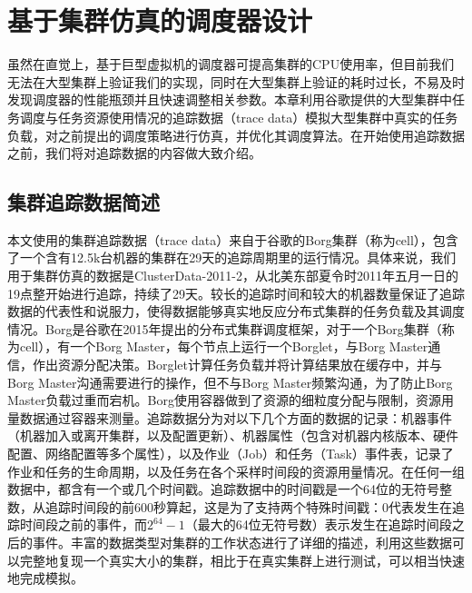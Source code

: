 
\chapter{基于集群仿真的调度器设计}
虽然在直觉上，基于巨型虚拟机的调度器可提高集群的CPU使用率，但目前我们无法在大型集群上验证我们的实现，同时在大型集群上验证的耗时过长，不易及时发现调度器的性能瓶颈并且快速调整相关参数。本章利用谷歌提供的大型集群中任务调度与任务资源使用情况的追踪数据（trace data）模拟大型集群中真实的任务负载，对之前提出的调度策略进行仿真，并优化其调度算法。在开始使用追踪数据之前，我们将对追踪数据的内容做大致介绍。

\section{集群追踪数据简述}
本文使用的集群追踪数据（trace data）来自于谷歌的Borg集群（称为cell），包含了一个含有12.5k台机器的集群在29天的追踪周期里的运行情况。具体来说，我们用于集群仿真的数据是ClusterData-2011-2，从北美东部夏令时2011年五月一日的19点整开始进行追踪，持续了29天。较长的追踪时间和较大的机器数量保证了追踪数据的代表性和说服力，使得数据能够真实地反应分布式集群的任务负载及其调度情况。Borg\cite{borg}是谷歌在2015年提出的分布式集群调度框架，对于一个Borg集群（称为cell），有一个Borg Master，每个节点上运行一个Borglet，与Borg Master通信，作出资源分配决策。Borglet计算任务负载并将计算结果放在缓存中，并与Borg Master沟通需要进行的操作，但不与Borg Master频繁沟通，为了防止Borg Master负载过重而宕机。Borg使用容器做到了资源的细粒度分配与限制，资源用量数据通过容器来测量。追踪数据分为对以下几个方面的数据的记录：机器事件（机器加入或离开集群，以及配置更新）、机器属性（包含对机器内核版本、硬件配置、网络配置等多个属性），以及作业（Job）和任务（Task）事件表，记录了作业和任务的生命周期，以及任务在各个采样时间段的资源用量情况。在任何一组数据中，都含有一个或几个时间戳。追踪数据中的时间戳是一个64位的无符号整数，从追踪时间段的前600秒算起，这是为了支持两个特殊时间戳：0代表发生在追踪时间段之前的事件，而$2^{64}-1$（最大的64位无符号数）表示发生在追踪时间段之后的事件。丰富的数据类型对集群的工作状态进行了详细的描述，利用这些数据可以完整地复现一个真实大小的集群，相比于在真实集群上进行测试，可以相当快速地完成模拟。


